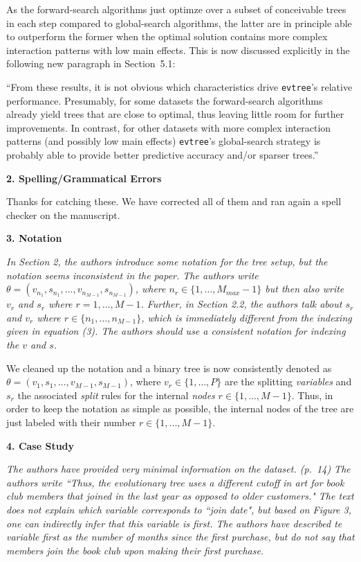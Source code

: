 \documentclass[DIN, pagenumber=false, parskip=half,%
               fromalign=left, fromphone=true,%
               fromemail=true, fromurl=false, %
               fromlogo=true, fromrule=false, fromrule=afteraddress]{scrlttr2}
\begin{document}
As the forward-search algorithms just optimze over a subset of conceivable
trees in each step compared to global-search algorithms, the latter are in principle
able to outperform the former when the optimal solution contains more complex
interaction patterns with low main effects. This is now discussed explicitly
in the following new paragraph in Section~5.1:

``From these results, it is not obvious which characteristics drive \texttt{evtree}'s
relative performance. Presumably, for some datasets the forward-search algorithms already
yield trees that are close to optimal, thus leaving little room for further
improvements. In contrast, for other datasets with more complex interaction patterns
(and possibly low main effects) \texttt{evtree}'s global-search strategy is probably
able to provide better predictive accuracy and/or sparser trees.''

\bigskip

\textbf{2. Spelling/Grammatical Errors}

Thanks for catching these. We have corrected all of them and ran again a spell
checker on the manuscript.

\bigskip

\textbf{3. Notation}

\textit{In Section 2, the authors introduce some notation for the tree setup,
but the notation seems inconsistent in the paper. The authors write
$\theta=(v_{n_1}, s_{n_1},\dots,v_{n_{M-1}},s_{n_{M-1}})$, where $n_r \in
\{1,\dots, M_{max}-1\}$ but then also write $v_r$ and $s_r$ where
$r=1,\dots,M-1$. Further, in Section 2.2, the authors talk about $s_r$ and $v_r$
where $r \in \{n_1, \dots, n_{M-1} \}$, which is immediately different from the
indexing given in equation (3). The authors should use a consistent notation for
indexing the $v$ and $s$.}

We cleaned up the notation and a binary tree is now consistently denoted
as $\theta=(v_1, s_1, \dots, v_{M-1}, s_{M-1})$, 
where $v_r \in \{1, \dots ,P\}$ are the splitting \emph{variables} and $s_r$ the
associated \emph{split} rules for the internal \emph{nodes} $r \in \{1,...,M-1\}$.
Thus, in order to keep the notation as simple as possible, the internal nodes of the
tree are just labeled with their number $r \in \{1,...,M-1\}$.


\bigskip

\textbf{4. Case Study}

\textit{The authors have provided very minimal information on the dataset.
(p.~14) The authors write ``Thus, the evolutionary tree uses a different cutoff
in art for book club members that joined in the last year as opposed to older
customers." The text does not explain which variable corresponds to ``join
date", but based on Figure 3, one can indirectly infer that this variable is
first. The authors have described te variable first as the number of months
since the first purchase, but do not say that members join the book club upon
making their first purchase.}
\end{document}
